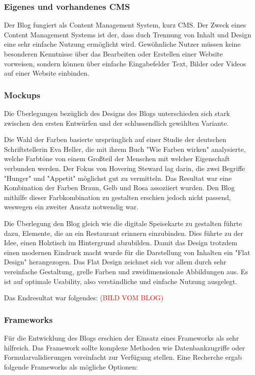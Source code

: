     \subsubsection{Eigenes und vorhandenes CMS}
    Der Blog fungiert als Content Management System, kurz CMS. Der Zweck eines
    Content Management Systems ist der, dass duch Trennung von Inhalt und Design eine
    sehr einfache Nutzung ermöglicht wird. Gewöhnliche Nutzer müssen keine besonderen
    Kenntnisse über das Bearbeiten oder Erstellen einer Website vorweisen, sondern
    können über einfache Eingabefelder Text, Bilder oder Videos auf einer Website einbinden.

    \subsubsection{Mockups}
    Die Überlegungen bezüglich des Designs des Blogs unterschieden sich stark zwischen den ersten
    Entwürfen und der schlussendlich gewählten Variante.

    Die Wahl der Farben basierte ursprünglich auf einer Studie der deutschen Schriftstellerin Eva Heller,
    die mit ihrem Buch {"Wie Farben wirken"\cite{WieFarbenWirken}} analysierte, welche Farbtöne von einem Großteil der Menschen
    mit welcher Eigenschaft verbunden werden. Der Fokus von Hovering Steward lag darin, die zwei Begriffe "Hunger"
    und "Appetit" möglichst gut zu vermitteln. Das Resultat war eine Kombination der Farben Braun, Gelb und Rosa
    assoziiert wurden. Den Blog mithilfe dieser Farbkombination zu gestalten erschien jedoch nicht passend, weswegen
    ein zweiter Ansatz notwendig war.

    Die Überlegung den Blog gleich wie die digitale Speisekarte zu gestalten führte dazu, Elemente, die an ein Restaurant
    erinnern einzubinden. Dies führte zu der Idee, einen Holztisch im Hintergrund abzubilden.
    Damit das Design trotzdem einen modernen Eindruck macht wurde für die Darstellung von Inhalten ein {"Flat Design"\cite{FlatDesign}}
    herangezogen. Das Flat Design zeichnet sich vor allem durch sehr vereinfache Gestaltung, grelle Farben und zweidimensionale Abbildungen aus.
    Es ist auf optimale Usability, also verständliche und einfache Nutzung ausgelegt.

    Das Endresultat war folgendes:
    \textcolor{red}{(BILD VOM BLOG)}

    \subsubsection{Frameworks}
    Für die Entwicklung des Blogs erschien der Einsatz eines Frameworks als sehr hilfreich. Das Framework sollte komplexe Methoden wie
    Datenbankzugriffe oder Formularvalidierungen vereinfacht zur Verfügung stellen. Eine Recherche ergab folgende Frameworks als mögliche
    Optionen:

